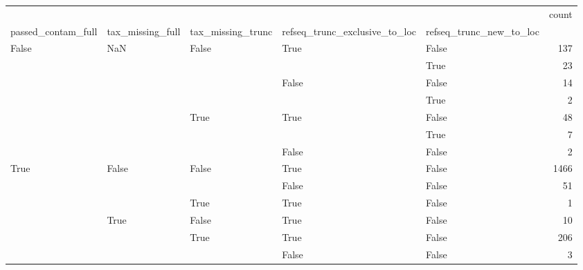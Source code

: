 \begin{tabular}{lllllr}
\toprule
 &  &  &  &  & count \\
passed_contam_full & tax_missing_full & tax_missing_trunc & refseq_trunc_exclusive_to_loc & refseq_trunc_new_to_loc &  \\
\midrule
\multirow[t]{7}{*}{False} & \multirow[t]{7}{*}{NaN} & \multirow[t]{4}{*}{False} & \multirow[t]{2}{*}{True} & False & 137 \\
 &  &  &  & True & 23 \\
\cline{4-6}
 &  &  & \multirow[t]{2}{*}{False} & False & 14 \\
 &  &  &  & True & 2 \\
\cline{3-6} \cline{4-6}
 &  & \multirow[t]{3}{*}{True} & \multirow[t]{2}{*}{True} & False & 48 \\
 &  &  &  & True & 7 \\
\cline{4-6}
 &  &  & False & False & 2 \\
\cline{1-6} \cline{2-6} \cline{3-6} \cline{4-6}
\multirow[t]{6}{*}{True} & \multirow[t]{3}{*}{False} & \multirow[t]{2}{*}{False} & True & False & 1466 \\
\cline{4-6}
 &  &  & False & False & 51 \\
\cline{3-6} \cline{4-6}
 &  & True & True & False & 1 \\
\cline{2-6} \cline{3-6} \cline{4-6}
 & \multirow[t]{3}{*}{True} & False & True & False & 10 \\
\cline{3-6} \cline{4-6}
 &  & \multirow[t]{2}{*}{True} & True & False & 206 \\
\cline{4-6}
 &  &  & False & False & 3 \\
\cline{1-6} \cline{2-6} \cline{3-6} \cline{4-6}
\bottomrule
\end{tabular}
